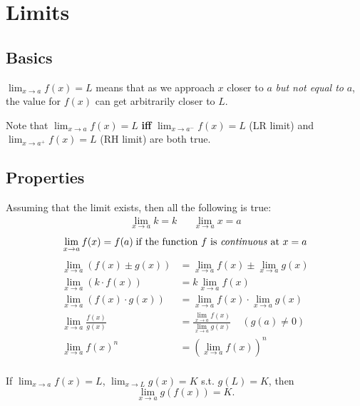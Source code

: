 \documentclass[10pt]{extarticle}
\theoremstyle{definition}
\begin{document}
	\section{Limits}
	\begin{multicols}{2} \raggedcolumns \setcounter{unbalance}{10}
		\subsection*{Basics}
		\begin{definition}[rough]
			\(\lim_{x \to a}{f(x)} = L\) means that as we approach \(x\) closer to \(a\) \emph{but not equal to} \(a\), 
			the value for \(f(x)\) can get arbitrarily closer to \(L\).
		\end{definition}

		Note that \(\lim_{x \to a}{f(x)} = L\) \textbf{iff} \(\lim_{x \to a^{-}}{f(x)} = L\) (LR limit) 
		and \(\lim_{x \to a^{+}}{f(x)} = L\) (RH limit) are both true.

		\subsection*{Properties}
		Assuming that the limit exists, then all the following is true:
		\begin{align*}
			\lim_{x \to a} k = k && \lim_{x \to a} x = a
		\end{align*}
		\begin{equation*}
			\lim_{x \to a} f(x) = f(a) \; \text{if the function \(f\) is \emph{continuous} at \(x = a\)}
		\end{equation*}
		\begin{align*}
			\lim_{x \to a}(f(x) \pm g(x)) &= \lim_{x \to a}f(x) \pm \lim_{x \to a}g(x) \\
			\lim_{x \to a}(k \cdot f(x)) &= k \lim_{x \to a}f(x) \\
			\lim_{x \to a}(f(x) \cdot g(x)) &= \lim_{x \to a}{f(x)} \cdot \lim_{x \to a}{g(x)} \\
			\lim_{x \to a} \frac{f(x)}{g(x)} &= \frac{\lim_{x \to a} f(x)}{\lim_{x \to a} g(x)} \;\;\;\; (g(a) \neq 0) \\
			\lim_{x \to a}f(x)^n &= \left( \lim_{x \to a}{f(x)}\right)^n \\
		\end{align*}

		If \(\displaystyle \lim_{x \to a} f(x) = L\), \(\displaystyle \lim_{x \to L} g(x) = K\) s.t. \(g(L) = K\), then
		\begin{equation*}
			\lim_{x \to a} g(f(x)) = K.
		\end{equation*}


\end{multicols}
\end{document}
